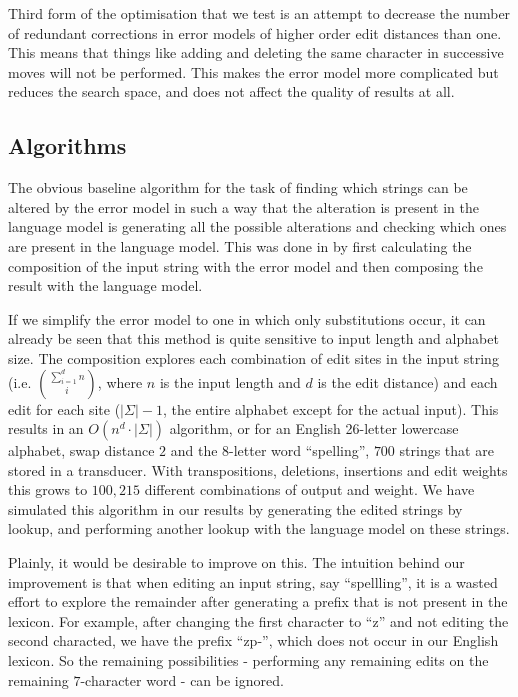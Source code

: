 \documentclass[11pt]{article}
\begin{document}
Third form of the optimisation that we test is an attempt to decrease the
number of redundant corrections in error models of higher order edit distances
than one. This means that things like  adding and deleting the
same character in successive moves will not be performed. This makes the error
model more complicated but reduces the search space, and does not affect the
quality of results at all.

\subsection{Algorithms}
\label{sec:algorithms}
The obvious baseline algorithm for the task of finding which strings can be
altered by the error model in such a way that the alteration is present in the
language model is generating all the possible alterations and checking which
ones are present in the language model. This was done in 
by first calculating the composition of the input string with the error
model and then composing the result with the language model.

If we simplify the error model to one in which only substitutions occur, it can
already be seen that this method is quite sensitive to input length and
alphabet size. The composition explores each combination of edit sites in the
input string (i.e. $\sum_{i=1}^d n \choose i$, where $n$ is the input length
and $d$ is the edit distance) and each edit for each site ($|\Sigma| - 1$, the
entire alphabet except for the actual input). This results in an $O(n^d \cdot
|\Sigma|)$ algorithm, or for an English 26-letter lowercase alphabet, swap
distance $2$ and the $8$-letter word ``spelling'', $700$ strings that are
stored in a transducer. With transpositions, deletions, insertions and edit
weights this grows to $100,215$ different combinations of output and weight. We
have simulated this algorithm in our results by generating the edited strings
by lookup, and performing another lookup with the language model on these
strings.

Plainly, it would be desirable to improve on this. The intuition behind our
improvement is that when editing an input string, say ``spellling'', it is a
wasted effort to explore the remainder after generating a prefix that is not
present in the lexicon. For example, after changing the first character to ``z''
and not editing the second characted, we have the prefix ``zp-'', which does
not occur in our English lexicon. So the remaining possibilities - performing
any remaining edits on the remaining $7$-character word - can be ignored.
\end{document}

